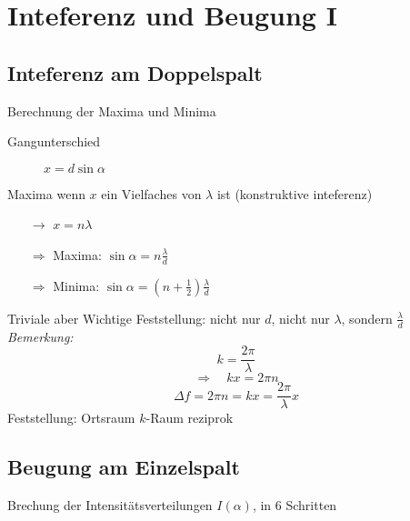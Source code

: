 \documentclass[titlepage,11pt,a4paper,ngerman]{report}
\begin{document}

\section{Inteferenz und Beugung I}
\subsection{Inteferenz am Doppelspalt}

Berechnung der Maxima und Minima
\begin{description}
	\item[Gangunterschied] $x = d \sin \alpha$
\end{description}
Maxima wenn $x$ ein Vielfaches von $\lambda$ ist (konstruktive inteferenz)
\begin{itemize}
	\item[$\rightarrow$] $x = n \lambda$
	\item[$\Rightarrow$] Maxima: $\sin\alpha = n \frac{\lambda}{d}$
	\item[$\Rightarrow$] Minima: $\sin\alpha = \left(n + \frac{1}{2}\right)\frac{\lambda}{d}$
\end{itemize}

Triviale aber Wichtige Feststellung: nicht nur $d$, nicht nur $\lambda$, sondern $\frac{\lambda}{d}$\\
\emph{Bemerkung: } $$k= \frac{2\pi}{\lambda}$$
$$\Rightarrow \quad kx = 2 \pi n$$
$$\Delta f = 2\pi n = kx = \frac{2 \pi}{\lambda}x$$
Feststellung: Ortsraum $k$-Raum reziprok 



\subsection{Beugung am Einzelspalt}

Brechung der Intensitätsverteilungen $ I(\alpha) $, in 6 Schritten
\end{document}
